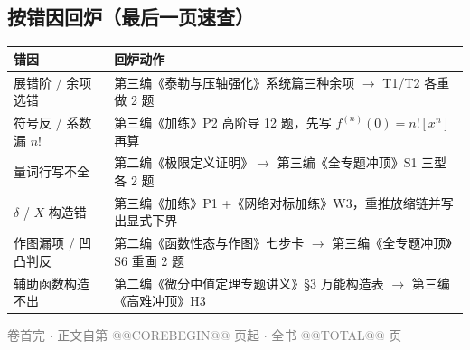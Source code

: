 \documentclass[11pt,a4paper]{ctexart}
\begin{document}
\subsection{按错因回炉（最后一页速查）}
\begin{longtable}{@{}p{4.4cm}p{10.6cm}@{}}
\toprule
\textbf{错因} & \textbf{回炉动作} \\
\midrule
展错阶 / 余项选错 & 第三编《泰勒与压轴强化》系统篇三种余项 $\to$ T1/T2 各重做 2 题 \\
符号反 / 系数漏 $n!$ & 第三编《加练》P2 高阶导 12 题，先写 $f^{(n)}(0)=n![x^n]$ 再算 \\
量词行写不全 & 第二编《极限定义证明》$\to$ 第三编《全专题冲顶》S1 三型各 2 题 \\
$\delta$ / $X$ 构造错 & 第三编《加练》P1 +《网络对标加练》W3，重推放缩链并写出显式下界 \\
作图漏项 / 凹凸判反 & 第二编《函数性态与作图》七步卡 $\to$ 第三编《全专题冲顶》S6 重画 2 题 \\
辅助函数构造不出 & 第二编《微分中值定理专题讲义》\S3 万能构造表 $\to$ 第三编《高难冲顶》H3 \\
\bottomrule
\end{longtable}

\vfill
\begin{center}
\textcolor{gray}{\footnotesize 卷首完 $\cdot$ 正文自第 @@COREBEGIN@@ 页起 $\cdot$ 全书 @@TOTAL@@ 页}
\end{center}
\end{document}
